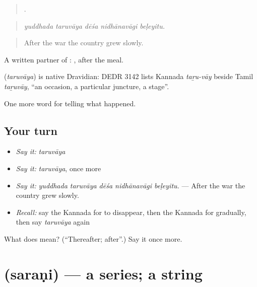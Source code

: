 \begin{quote}
    .
\end{quote}

\begin{quote}
\emph{yuddhada taruvāya dēśa nidhānavāgi beḷeyitu.}
\end{quote}

\begin{quote}
After the war the country grew slowly.
\end{quote}

A written partner of :  , after the meal.

\begin{cousinweb}
\textbf{} (\emph{taruvāya}) is native Dravidian: DEDR 3142 lists Kannada \emph{taṟu-vāy} beside Tamil \emph{taṟuvāy}, \textquotedblleft{}an occasion, a particular juncture, a stage\textquotedblright{}.
\end{cousinweb}

\begin{grammarlens}[title={What you've built}]
One more word for telling what happened.
\end{grammarlens}

\subsection*{Your turn}
\begin{itemize}
\raggedright
  \item \emph{Say it:} \emph{taruvāya}
  \item \emph{Say it:} \emph{taruvāya}, once more
  \item \emph{Say it:} \emph{yuddhada taruvāya dēśa nidhānavāgi beḷeyitu.} — After the war the country grew slowly.
  \item \emph{Recall:} say the Kannada for to disappear, then the Kannada for gradually, then say \emph{taruvāya} again
\end{itemize}

\begin{tcolorbox}[breakable,colback=teal!4,colframe=teal!35!black,title={Before you move on}]
What does  mean? (\textquotedblleft{}Thereafter; after\textquotedblright{}.) Say it once more.
\end{tcolorbox}
\section[\texorpdfstring{\kn{ಸರಣಿ} (saraṇi)}{ಸರಣಿ (saraṇi)}]{ (saraṇi) — a series; a string}

